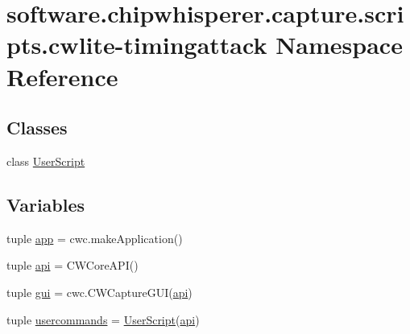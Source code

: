 \hypertarget{namespacesoftware_1_1chipwhisperer_1_1capture_1_1scripts_1_1cwlite-timingattack}{}\section{software.\+chipwhisperer.\+capture.\+scripts.\+cwlite-\/timingattack Namespace Reference}
\label{namespacesoftware_1_1chipwhisperer_1_1capture_1_1scripts_1_1cwlite-timingattack}
\subsection*{Classes}
\begin{DoxyCompactItemize}
\item 
class \hyperlink{classsoftware_1_1chipwhisperer_1_1capture_1_1scripts_1_1cwlite-timingattack_1_1UserScript}{User\+Script}
\end{DoxyCompactItemize}
\subsection*{Variables}
\begin{DoxyCompactItemize}
\item 
tuple \hyperlink{namespacesoftware_1_1chipwhisperer_1_1capture_1_1scripts_1_1cwlite-timingattack_ac009d7cfe60653ce2dd6caf1e06df1f5}{app} = cwc.\+make\+Application()
\item 
tuple \hyperlink{namespacesoftware_1_1chipwhisperer_1_1capture_1_1scripts_1_1cwlite-timingattack_a452abda888c34b0cc5d5684b00602f9e}{api} = C\+W\+Core\+A\+P\+I()
\item 
tuple \hyperlink{namespacesoftware_1_1chipwhisperer_1_1capture_1_1scripts_1_1cwlite-timingattack_a2fc88bd3660927f0a48ecb252342b44b}{gui} = cwc.\+C\+W\+Capture\+G\+U\+I(\hyperlink{namespacesoftware_1_1chipwhisperer_1_1capture_1_1scripts_1_1cwlite-timingattack_a452abda888c34b0cc5d5684b00602f9e}{api})
\item 
tuple \hyperlink{namespacesoftware_1_1chipwhisperer_1_1capture_1_1scripts_1_1cwlite-timingattack_a4e087fe66d38c06cb1a228828d83213a}{usercommands} = \hyperlink{classsoftware_1_1chipwhisperer_1_1capture_1_1scripts_1_1cwlite-timingattack_1_1UserScript}{User\+Script}(\hyperlink{namespacesoftware_1_1chipwhisperer_1_1capture_1_1scripts_1_1cwlite-timingattack_a452abda888c34b0cc5d5684b00602f9e}{api})
\end{DoxyCompactItemize}


